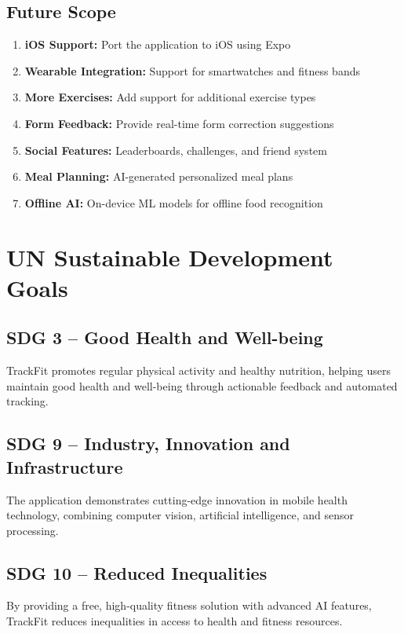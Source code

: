 \documentclass[12pt]{report}
\begin{document}
\section{Future Scope}
\begin{enumerate}
    \item \textbf{iOS Support:} Port the application to iOS using Expo
    \item \textbf{Wearable Integration:} Support for smartwatches and fitness bands
    \item \textbf{More Exercises:} Add support for additional exercise types
    \item \textbf{Form Feedback:} Provide real-time form correction suggestions
    \item \textbf{Social Features:} Leaderboards, challenges, and friend system
    \item \textbf{Meal Planning:} AI-generated personalized meal plans
    \item \textbf{Offline AI:} On-device ML models for offline food recognition
\end{enumerate}

\chapter{UN Sustainable Development Goals}
\section{SDG 3 – Good Health and Well-being}
TrackFit promotes regular physical activity and healthy nutrition, helping users maintain good health and well-being through actionable feedback and automated tracking.

\section{SDG 9 – Industry, Innovation and Infrastructure}
The application demonstrates cutting-edge innovation in mobile health technology, combining computer vision, artificial intelligence, and sensor processing.

\section{SDG 10 – Reduced Inequalities}
By providing a free, high-quality fitness solution with advanced AI features, TrackFit reduces inequalities in access to health and fitness resources.
\end{document}
